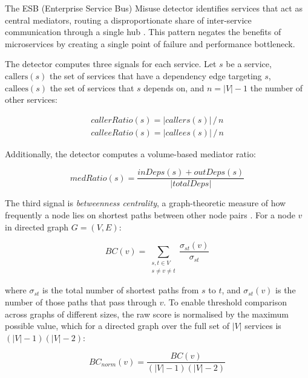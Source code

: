 \par The ESB (Enterprise Service Bus) Misuse detector identifies services that act as central mediators, routing a disproportionate share of inter-service communication through a single hub \cite{Taibi2018, Richards2015}. This pattern negates the benefits of microservices by creating a single point of failure and performance bottleneck.

The detector computes three signals for each service. Let $s$ be a service, $\text{callers}(s)$ the set of services that have a dependency edge targeting $s$, $\text{callees}(s)$ the set of services that $s$ depends on, and $n = |V| - 1$ the number of other services:

\begin{equation}
    \begin{array}{l}
        \mathit{callerRatio}(s) = |\mathit{callers}(s)|\, /\, n \\[6pt]
        \mathit{calleeRatio}(s) = |\mathit{callees}(s)|\, /\, n
    \end{array}
    \label{eq:esb-ratios}
\end{equation}

Additionally, the detector computes a volume-based mediator ratio:

\begin{equation}
    \mathit{medRatio}(s) = \frac{\mathit{inDeps}(s) + \mathit{outDeps}(s)}{|\mathit{totalDeps}|}
    \label{eq:esb-mediator-ratio}
\end{equation}

The third signal is \textit{betweenness centrality}, a graph-theoretic measure of how frequently a node lies on shortest paths between other node pairs \cite{Brandes2001}. For a node $v$ in directed graph $G = (V, E)$:

\begin{equation}
    BC(v) = \sum_{\substack{s,t \in V \\ s \neq v \neq t}} \frac{\sigma_{st}(v)}{\sigma_{st}}
    \label{eq:betweenness-centrality}
\end{equation}

\noindent where $\sigma_{st}$ is the total number of shortest paths from $s$ to $t$, and $\sigma_{st}(v)$ is the number of those paths that pass through $v$. To enable threshold comparison across graphs of different sizes, the raw score is normalised by the maximum possible value, which for a directed graph over the full set of $|V|$ services is $(|V|-1)(|V|-2)$:

\begin{equation}
    BC_{\mathit{norm}}(v) = \frac{BC(v)}{(|V|-1)(|V|-2)}
    \label{eq:betweenness-norm}
\end{equation}

